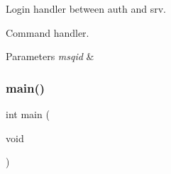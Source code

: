 Login handler between auth and srv. 

Command handler.


\begin{DoxyParams}{Parameters}
{\em msqid} & \\
\hline
\end{DoxyParams}
\mbox{\label{file_8c_a840291bc02cba5474a4cb46a9b9566fe}} 
\subsubsection{main()}
{\footnotesize\ttfamily int main (\begin{DoxyParamCaption}\item[{void}]{ }\end{DoxyParamCaption})}

